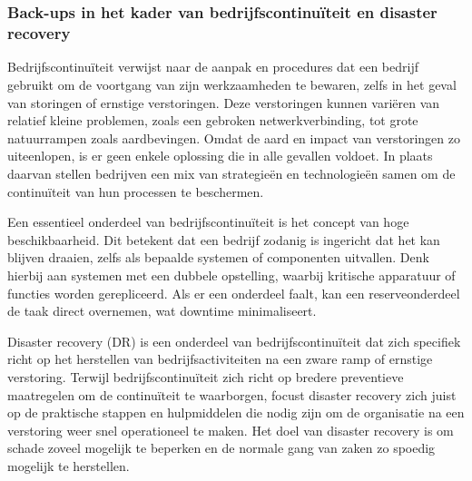 \chapter{}%
\label{ch:Literatuurstudie}

\subsection{Back-ups in het kader van bedrijfscontinuïteit en disaster recovery}
Bedrijfscontinuïteit verwijst naar de aanpak en procedures dat een bedrijf gebruikt om de voortgang van zijn werkzaamheden te bewaren, zelfs in het geval van storingen of ernstige verstoringen. Deze verstoringen kunnen variëren van relatief kleine problemen, zoals een gebroken netwerkverbinding, tot grote natuurrampen zoals aardbevingen. Omdat de aard en impact van verstoringen zo uiteenlopen, is er geen enkele oplossing die in alle gevallen voldoet. In plaats daarvan stellen bedrijven een mix van strategieën en technologieën samen om de continuïteit van hun processen te beschermen.

Een essentieel onderdeel van bedrijfscontinuïteit is het concept van hoge beschikbaarheid. Dit betekent dat een bedrijf zodanig is ingericht dat het kan blijven draaien, zelfs als bepaalde systemen of componenten uitvallen. Denk hierbij aan systemen met een dubbele opstelling, waarbij kritische apparatuur of functies worden gerepliceerd. Als er een onderdeel faalt, kan een reserveonderdeel de taak direct overnemen, wat downtime minimaliseert.

Disaster recovery (DR) is een onderdeel van bedrijfscontinuïteit dat zich specifiek richt op het herstellen van bedrijfsactiviteiten na een zware ramp of ernstige verstoring. Terwijl bedrijfscontinuïteit zich richt op bredere preventieve maatregelen om de continuïteit te waarborgen, focust disaster recovery zich juist op de praktische stappen en hulpmiddelen die nodig zijn om de organisatie na een verstoring weer snel operationeel te maken. Het doel van disaster recovery is om schade zoveel mogelijk te beperken en de normale gang van zaken zo spoedig mogelijk te herstellen. \autocite{Zhu2015}
